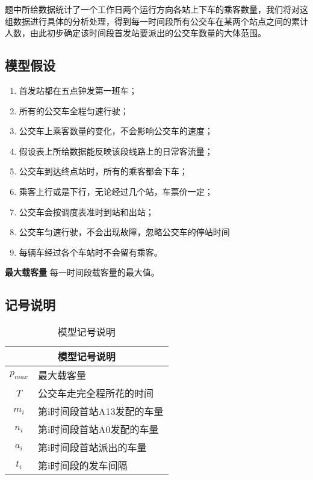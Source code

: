 \documentclass{cumcmart}
\begin{document}
题中所给数据统计了一个工作日两个运行方向各站上下车的乘客数量，我们将对这组数据进行具体的分析处理，得到每一时间段所有公交车在某两个站点之间的累计人数，由此初步确定该时间段首发站要派出的公交车数量的大体范围。

\subsection{模型假设}

\begin{enumerate}
\item 首发站都在五点钟发第一班车；
\item 所有的公交车全程匀速行驶；
\item 公交车上乘客数量的变化，不会影响公交车的速度；
\item 假设表上所给数据能反映该段线路上的日常客流量；
\item 公交车到达终点站时，所有的乘客都会下车；
\item 乘客上行或是下行，无论经过几个站，车票价一定；
\item 公交车会按调度表准时到站和出站；
\item 公交车匀速行驶，不会出现故障，忽略公交车的停站时间
\item 每辆车经过各个车站时不会留有乘客。


\end{enumerate}

  \textbf{最大载客量} \space 每一时间段载客量的最大值。

\subsection{记号说明}
\begin{table}[!htbp]
    \centering
    \begin{tabular}{cl}
    \toprule
    \multicolumn{2}{c}{\large 模型记号说明}\\
    \midrule
    ${p_{max}}$ &  最大载客量 \\
    ${T}$       &  公交车走完全程所花的时间 \\
    ${m_i}$     &  第i时间段首站A13发配的车量 \\
    ${n_i}$     &  第i时间段首站A0发配的车量  \\
    ${a_i}$     &  第i时间段首站派出的车量  \\
    ${t_i}$     &  第i时间段的发车间隔  \\
    \bottomrule
    \end{tabular}
    \caption{模型记号说明}
\end{table}
\end{document}
